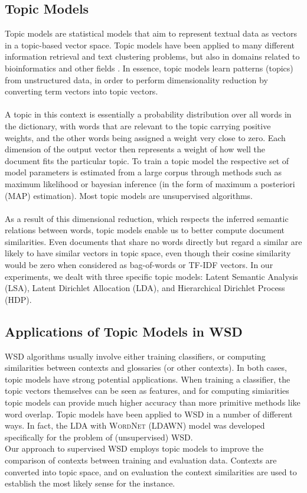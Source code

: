 \subsection{Topic Models}
Topic models are statistical models that aim to represent textual data as vectors in a topic-based vector space. Topic models have been applied to many different information retrieval and text clustering problems, but also in domains related to bioinformatics and other fields \cite{bioinformatics}. In essence, topic models learn patterns (topics) from unstructured data, in order to perform dimensionality reduction by converting term vectors into topic vectors. \\\\
A topic in this context is essentially a probability distribution over all words in the dictionary, with words that are relevant to the topic carrying positive weights, and the other words being assigned a weight very close to zero. Each dimension of the output vector then represents a weight of how well the document fits the particular topic. To train a topic model the respective set of model parameters is estimated from a large corpus through methods such as maximum likelihood or bayesian inference (in the form of maximum a posteriori (MAP) estimation). Most topic models are unsupervised algorithms.\\\\
As a result of this dimensional reduction, which respects the inferred semantic relations between words, topic models enable us to better compute document similarities. Even documents that share no words directly but regard a similar are likely to have similar vectors in topic space, even though their cosine similarity would be zero when considered as bag-of-words or TF-IDF vectors. In our experiments, we dealt with three specific topic models: Latent Semantic Analysis (LSA)\cite{LSA_paper}, Latent Dirichlet Allocation (LDA)\cite{LDA_paper}, and Hierarchical Dirichlet Process (HDP)\cite{HDP_paper}.


\subsection{Applications of Topic Models in WSD}
WSD algorithms usually involve either training classifiers, or computing similarities between contexts and glossaries (or other contexts). In both cases, topic models have strong potential applications. When training a classifier, the topic vectors themselves can be seen as features, and for computing simiarities topic models can provide much higher accuracy than more primitive methods like word overlap. Topic models have been applied to WSD in a number of different ways\cite{topic_models_in_wsd}. In fact, the LDA with \textsc{WordNet} (LDAWN) model was developed specifically for the problem of (unsupervised) WSD\cite{LDAWN}. \\
Our approach to supervised WSD employs topic models to improve the comparison of contexts between training and evaluation data. Contexts are converted into topic space, and on evaluation the context similarities are used to establish the most likely sense for the instance.